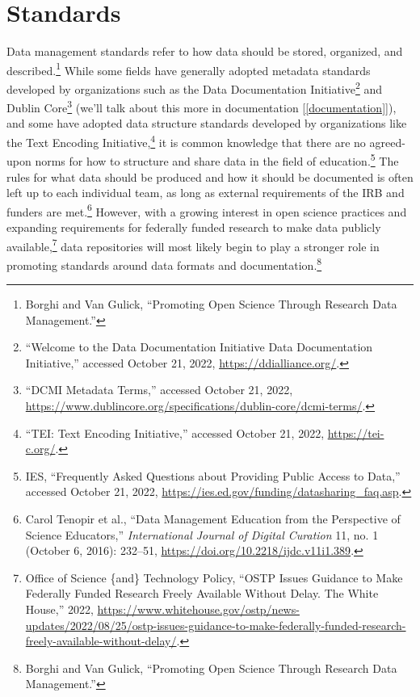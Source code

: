 \documentclass[
]{book}
\begin{document}
\hypertarget{standards}{%
\section{Standards}\label{standards}}

Data management standards refer to how data should be stored, organized, and described.\footnote{Borghi and Van Gulick, {``Promoting Open Science Through Research Data Management.''}} While some fields have generally adopted metadata standards developed by organizations such as the Data Documentation Initiative\footnote{{``Welcome to the Data Documentation Initiative {\textbar} Data Documentation Initiative,''} accessed October 21, 2022, \url{https://ddialliance.org/}.} and Dublin Core\footnote{{``{DCMI} Metadata Terms,''} accessed October 21, 2022, \url{https://www.dublincore.org/specifications/dublin-core/dcmi-terms/}.} (we'll talk about this more in documentation {[}\ref{documentation}{]}), and some have adopted data structure standards developed by organizations like the Text Encoding Initiative,\footnote{{``{TEI}: Text Encoding Initiative,''} accessed October 21, 2022, \url{https://tei-c.org/}.} it is common knowledge that there are no agreed-upon norms for how to structure and share data in the field of education.\footnote{IES, {``Frequently Asked Questions about Providing Public Access to Data,''} accessed October 21, 2022, \url{https://ies.ed.gov/funding/datasharing_faq.asp}.} The rules for what data should be produced and how it should be documented is often left up to each individual team, as long as external requirements of the IRB and funders are met.\footnote{Carol Tenopir et al., {``Data Management Education from the Perspective of Science Educators,''} \emph{International Journal of Digital Curation} 11, no. 1 (October 6, 2016): 232--51, \url{https://doi.org/10.2218/ijdc.v11i1.389}.} However, with a growing interest in open science practices and expanding requirements for federally funded research to make data publicly available,\footnote{Office of Science \{and\} Technology Policy, {``{OSTP} Issues Guidance to Make Federally Funded Research Freely Available Without Delay. The White House,''} 2022, \url{https://www.whitehouse.gov/ostp/news-updates/2022/08/25/ostp-issues-guidance-to-make-federally-funded-research-freely-available-without-delay/}.} data repositories will most likely begin to play a stronger role in promoting standards around data formats and documentation.\footnote{Borghi and Van Gulick, {``Promoting Open Science Through Research Data Management.''}}
\end{document}

